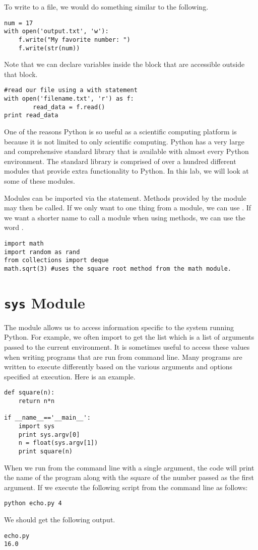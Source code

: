 To write to a file, we would do something similar to the following.
\begin{lstlisting}
num = 17
with open('output.txt', 'w'):
    f.write("My favorite number: ")
    f.write(str(num))
\end{lstlisting}

Note that we can declare variables inside the  block that are accessible outside that block.
\begin{lstlisting}
#read our file using a with statement
with open('filename.txt', 'r') as f:
        read_data = f.read()
print read_data
\end{lstlisting}

One of the reasons Python is so useful as a scientific computing platform is because it is not limited to only scientific computing.
Python has a very large and comprehensive standard library that is available with almost every Python environment.
The standard library is comprised of over a hundred different modules that provide extra functionality to Python.
In this lab, we will look at some of these modules.

Modules can be imported via the  statement. Methods provided by the module may then be called.
If we only want to one thing from a module, we can use .
If we want a shorter name to call a module when using methods, we can use the word .
\begin{lstlisting}
import math
import random as rand
from collections import deque
math.sqrt(3) #uses the square root method from the math module.
\end{lstlisting}

\section*{\texttt{sys} Module}
The  module allows us to access information specific to the system running Python.
For example, we often import  to get the list  which is a list of arguments passed to the current environment.
It is sometimes useful to access these values when writing programs that are run from command line.
Many programs are written to execute differently based on the various arguments and options specified at execution.
Here is an example.
\begin{lstlisting}[title = echo.py]
def square(n):
    return n*n
        
if __name__=='__main__':
    import sys
    print sys.argv[0]
    n = float(sys.argv[1])
    print square(n)
\end{lstlisting}
When we run from the command line with a single argument, the code will print the name of the program along with the square of the number passed as the first argument.
If we execute the following script from the command line as follows:
\begin{lstlisting}[style=ShellInput]
python echo.py 4
\end{lstlisting}
We should get the following output.
\begin{lstlisting}[style=ShellOutput]
echo.py
16.0
\end{lstlisting}

